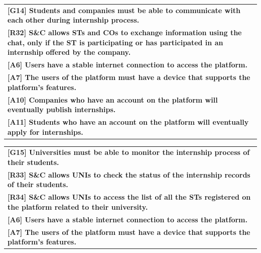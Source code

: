 \begin{center}
    \begin{tabular}{|p{37em}|}
        \rowcolor{bluepoli!40} %
        \hline
        \textbf{[G14] Students and companies must be able to communicate with each other during internship process.} \\
        \rowcolor{bluepoli!15}
        \textbf{[R32] S\&C allows STs and COs to exchange information using the chat, only if the ST is participating 
        or has participated in an internship offered by the company.} \\
        \textbf{[A6] Users have a stable internet connection to access the platform.}\\
        \textbf{[A7] The users of the platform must have a device that supports the platform's features.}\\
        \textbf{[A10] Companies who have an account on the platform will eventually publish internships.}\\
        \textbf{[A11] Students who have an account on the platform will eventually apply for internships.}\\
        \hline
    \end{tabular}
\end{center}

\begin{center}
    \begin{tabular}{|p{37em}|}
        \rowcolor{bluepoli!40} %
        \hline
        \textbf{[G15] Universities must be able to monitor the internship process of their students.} \\
        \rowcolor{bluepoli!15}
        \textbf{[R33] S\&C allows UNIs to check the status of the internship records of their students.} \\
        \rowcolor{bluepoli!15}
        \textbf{[R34] S\&C allows UNIs to access the list of all the STs registered on the platform related to their university.} \\
        \textbf{[A6] Users have a stable internet connection to access the platform.}\\
        \textbf{[A7] The users of the platform must have a device that supports the platform's features.}\\
        \hline
    \end{tabular}
\end{center}

